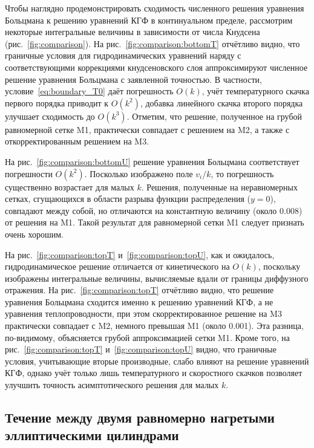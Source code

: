 \documentclass[
aps,%
12pt,%
final,%
notitlepage,%
oneside,%
onecolumn,%
nobibnotes,%
nofootinbib,%
superscriptaddress,%
noshowpacs,%
showkeys,%
floatfix,%
tightenlines,%
centertags]%
{revtex4}
\newcommand{\OO}[1]{O(#1)}
\begin{document}
Чтобы наглядно продемонстрировать сходимость численного решения уравнения Больцмана к
решению уравнений КГФ в континуальном пределе, рассмотрим некоторые интегральные величины
в зависимости от числа Кнудсена (рис.~\ref{fig:comparison}).
На рис.~\ref{fig:comparison:bottomT} отчётливо видно, что граничные условия для гидродинамических уравнений
наряду с соответствующими коррекциями кнудсеновского слоя
аппроксимируют численное решение уравнения Больцмана с заявленной точностью.
В частности, условие~\eqref{eq:boundary_T0} даёт погрешность \(\OO{k}\),
учёт температурного скачка первого порядка приводит к \(\OO{k^2}\),
добавка линейного скачка второго порядка улучшает сходимость до \(\OO{k^3}\).
Отметим, что решение, полученное на грубой равномерной сетке M1, практически совпадает с решением на M2,
а также с откорректированным решением на M3.

На рис.~\ref{fig:comparison:bottomU} решение уравнения Больцмана соответствует погрешности \(\OO{k^2}\).
Посколько изображено поле \(v_i/k\), то погрешность существенно возрастает для малых \(k\).
Решения, полученные на неравномерных сетках, сгущающихся в области разрыва функции распределения (\(y=0\)),
совпадают между собой, но отличаются на константную величину (около \(0.008\)) от решения на M1.
Такой результат для равномерной сетки M1 следует признать очень хорошим.

На рис.~\ref{fig:comparison:topT} и~\ref{fig:comparison:topU}, как и ожидалось, гидродинамическое решение
отличается от кинетического на \(\OO{k}\), поскольку изображены интегральные величины,
вычисляемые вдали от границы диффузного отражения.
На рис.~\ref{fig:comparison:topT} отчётливо видно, что решение уравнения Больцмана сходится
именно к решению уравнений КГФ, а не уравнения теплопроводности,
при этом скорректированное решение на M3 практически совпадает с M2, немного превышая M1 (около 0.001).
Эта разница, по-видимому, объясняется грубой аппроксимацией сетки M1.
Кроме того, на рис.~\ref{fig:comparison:topT} и~\ref{fig:comparison:topU} видно,
что граничные условия, учитывающие вторые производные, слабо влияют на решение уравнений КГФ,
однако учёт только лишь температурного и скоростного скачков позволяет улучшить точность асимптотического решения
для малых \(k\).

\subsection{Течение между двумя равномерно нагретыми эллиптическими цилиндрами}
\end{document}
